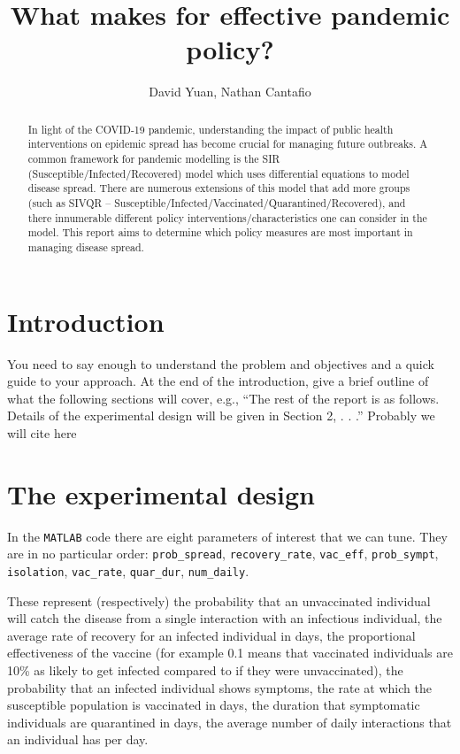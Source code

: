 \documentclass[12pt,a4paper]{article}
\title{What makes for effective pandemic policy?}
\author{David Yuan, Nathan Cantafio}
\date{}  %
\begin{document}
\maketitle

\begin{abstract}
In light of the COVID-19 pandemic, understanding the impact of public health interventions on epidemic spread has become crucial for managing future outbreaks. A common framework for pandemic modelling is the SIR (Susceptible/Infected/Recovered) model which uses differential equations to model disease spread. There are numerous extensions of this model that add more groups (such as SIVQR -- Susceptible/Infected/Vaccinated/Quarantined/Recovered), and there innumerable different policy interventions/characteristics one can consider in the model. This report aims to determine which policy measures are most important in managing disease spread.
\end{abstract} 

\section{Introduction}\label{section1}

You need to say enough to understand the problem and objectives and a
quick guide to your approach. At the end of the introduction, give a brief outline of what
the following sections will cover, e.g., ``The rest of the report is as follows. Details of the
experimental design will be given in Section 2, . . .''
Probably we will cite here
\cite{TURKYILMAZOGLU2022127429} %

\section{The experimental design}\label{section2}

In the \verb`MATLAB` code there are eight parameters of interest that we can tune. They are in no particular order:  \verb`prob_spread`, \verb`recovery_rate`, \verb`vac_eff`, \verb`prob_sympt`,  \verb`isolation`,  \verb`vac_rate`, \verb`quar_dur`, \verb`num_daily`.

These represent (respectively) the probability that an unvaccinated individual will catch the disease from a single interaction with an infectious individual, the average rate of recovery for an infected individual in days, the proportional effectiveness of the vaccine (for example 0.1 means that vaccinated individuals are 10\% as likely to get infected compared to if they were unvaccinated), the probability that an infected individual shows symptoms, the rate at which the susceptible population is vaccinated in days, the duration that symptomatic individuals are quarantined in days, the average number of daily interactions that an individual has per day. 
\end{document}
